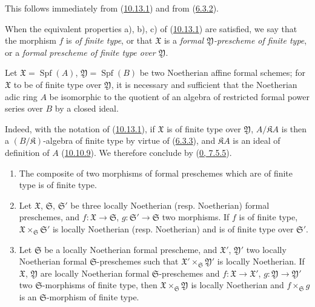 This follows immediately from (\hyperref[I.10.13.1]{10.13.1}) and from
(\hyperref[I.6.3.2]{6.3.2}).

\begin{definition}[10.13.3]
\label{I.10.13.3}
When the equivalent properties a), b), c) of
(\hyperref[I.10.13.1]{10.13.1}) are satisfied, we say that the morphism
$f$ is \emph{of finite type}, or that $\mathfrak{X}$ is a
\emph{formal $\mathfrak{Y}$-prescheme of finite type}, or a
\emph{formal prescheme of finite type over $\mathfrak{Y}$}.
\end{definition}

\begin{corollary}[10.13.4]
\label{I.10.13.4}
Let $\mathfrak{X}=\operatorname{Spf}(A)$,
$\mathfrak{Y}=\operatorname{Spf}(B)$ be two Noetherian affine formal
schemes; for $\mathfrak{X}$ to be of finite type over
$\mathfrak{Y}$, it is necessary and sufficient that the Noetherian adic ring
$A$ be isomorphic to the quotient of an algebra of restricted formal power
series over $B$ by a closed ideal.
\end{corollary}

Indeed, with the notation of (\hyperref[I.10.13.1]{10.13.1}), if
$\mathfrak{X}$ is of finite type over $\mathfrak{Y}$,
$A/\mathfrak{K}A$ is then a $(B/\mathfrak{K})$-algebra of finite type by
virtue of (\hyperref[I.6.3.3]{6.3.3}), and $\mathfrak{K}A$ is an ideal of
definition of $A$ (\hyperref[I.10.10.9]{10.10.9}). We therefore conclude
by (\hyperref[0.7.5.5]{0, 7.5.5}).

\begin{proposition}[10.13.5]
\label{I.10.13.5}
\medskip\noindent
\begin{enumerate}
  \item[\rm{(i)}] The composite of two morphisms of formal preschemes which
    are of finite type is of finite type.


  \item[\rm{(ii)}] Let $\mathfrak{X}$, $\mathfrak{S}$,
    $\mathfrak{S}'$ be three locally Noetherian (resp.
    Noetherian) formal preschemes, and $f:\mathfrak{X}\to\mathfrak{S}$,
    $g:\mathfrak{S}'\to\mathfrak{S}$ two morphisms. If $f$ is of finite
    type, $\mathfrak{X}\times_{\mathfrak{S}}\mathfrak{S}'$ is locally
    Noetherian (resp. Noetherian) and is of finite type over $\mathfrak{S}'$.
  \item[\rm{(iii)}] Let $\mathfrak{S}$ be a locally Noetherian formal
    prescheme, and $\mathfrak{X}'$, $\mathfrak{Y}'$ two locally Noetherian
    formal $\mathfrak{S}$-preschemes such that
    $\mathfrak{X}'\times_{\mathfrak{S}}\mathfrak{Y}'$ is locally
    Noetherian. If $\mathfrak{X}$, $\mathfrak{Y}$ are locally Noetherian
    formal $\mathfrak{S}$-preschemes and
    $f:\mathfrak{X}\to\mathfrak{X}'$,
    $g:\mathfrak{Y}\to\mathfrak{Y}'$ two $\mathfrak{S}$-morphisms of
    finite type, then $\mathfrak{X}\times_{\mathfrak{S}}\mathfrak{Y}$ is
    locally Noetherian and $f\times_{\mathfrak{S}}g$ is an
    $\mathfrak{S}$-morphism of finite type.
\end{enumerate}
\end{proposition}

